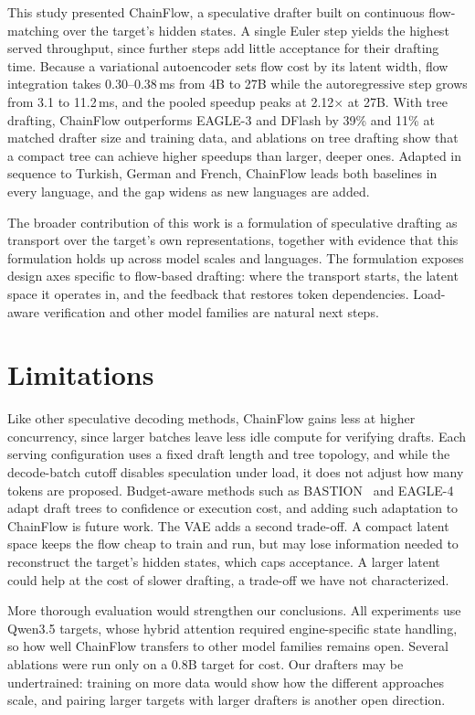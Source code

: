 \documentclass{article}
\newcommand{\Sys}{ChainFlow\xspace}
\begin{document}
This study presented \Sys, a speculative drafter built on continuous flow-matching
over the target's hidden states. A single Euler step yields the highest
served throughput, since further steps add little acceptance for their
drafting time. Because a variational autoencoder sets flow cost by its
latent width, flow integration takes 0.30--0.38\,ms from 4B to 27B while the
autoregressive step grows from 3.1 to 11.2\,ms, and the pooled speedup peaks at 2.12$\times$ at 27B.
With tree drafting, \Sys outperforms EAGLE-3 and DFlash by 39\% and 11\% at
matched drafter size and training data, and ablations on tree drafting show
that a compact tree can achieve higher speedups than larger, deeper ones.
Adapted in sequence to Turkish, German and French, \Sys leads both baselines
in every language, and the gap widens as new languages are added.

The broader contribution of this work is a formulation of speculative
drafting as transport over the target's own representations, together with
evidence that this formulation holds up across model scales and languages.
The formulation exposes design axes specific to flow-based drafting: where
the transport starts, the latent space it operates in, and the feedback that
restores token dependencies. Load-aware verification and other model
families are natural next steps.

\section*{Limitations}

Like other speculative decoding methods, \Sys gains less at higher concurrency, since larger batches leave less idle compute for verifying drafts. Each serving configuration uses a fixed draft length and tree topology, and while the decode-batch cutoff disables speculation under load, it does not adjust how many tokens are proposed. Budget-aware methods such as BASTION~\citep{oh2026bastion} and EAGLE-4~\citep{eagle4team2026} adapt draft trees to confidence or execution cost, and adding such adaptation to \Sys is future work. The VAE adds a second trade-off. A compact latent space keeps the flow cheap to train and run, but may lose information needed to reconstruct the target’s hidden states, which caps acceptance. A larger latent could help at the cost of slower drafting, a trade-off we have not characterized.

More thorough evaluation would strengthen our conclusions. All experiments use Qwen3.5 targets, whose hybrid attention required engine-specific state handling, so how well \Sys transfers to other model families remains open. Several ablations were run only on a 0.8B target for cost. Our drafters may be undertrained: training on more data would show how the different approaches scale, and pairing larger targets with larger drafters is another open direction.
\end{document}
